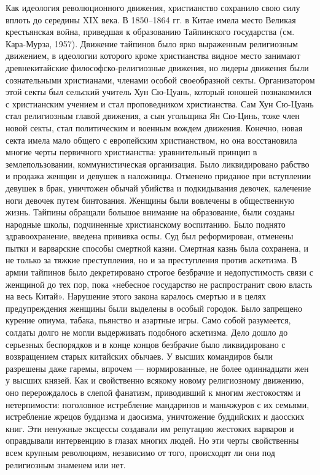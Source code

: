 Как   идеология   революционного  движения,   христианство   сохранило
свою  силу   вплоть  до  середины   XIX  века.  В  1850--1864   гг.  в
Китае   имела   место   Великая  крестьянская   война,   приведшая   к
образованию Тайпинского  государства (см. Кара-Мурза,  1957). Движение
тайпинов  было  ярко  выраженным религиозным  движением,  в  идеологии
которого  кроме  христианства  видное место  занимают  древнекитайские
философско-религиозные движения, но лидеры движения были сознательными
христианами,  членами особой  своеобразной  секты. Организатором  этой
секты был сельский учитель Хун Сю-Цуань, который юношей познакомился с
христианским  учением  и  стал  проповедником  христианства.  Сам  Хун
Сю-Цуань стал религиозным главой движения, а сын угольщика Ян Сю-Цинь,
тоже член  новой секты, стал  политическим и военным  вождем движения.
Конечно, новая секта имела мало общего с европейским христианством, но
она восстановила  многие черты первичного  христианства: уравнительный
принцип   в  землепользовании,   коммунистическая  организация.   Было
ликвидировано рабство и продажа женщин и девушек в наложницы. Отменено
приданое  при вступлении  девушек  в брак,  уничтожен обычай  убийства
и  подкидывания  девочек,  калечение ноги  девочек  путем  бинтования.
Женщины были вовлечены в  общественную жизнь. Тайпины обращали большое
внимание  на образование,  были  созданы  народные школы,  подчиненные
христианскому  воспитанию.   Было  поднято   здравоохранение,  введена
прививка  оспы.  Суд был  реформирован,  отменены  пытки и  варварские
способы смертной казни. Смертная казнь  была сохранена, и не только за
тяжкие преступления,  но и за  преступления против аскетизма.  В армии
тайпинов было декретировано строгое безбрачие и недопустимость связи с
женщиной до тех пор, пока  «небесное государство не распространит свою
власть на  весь Китай».  Нарушение этого закона  каралось смертью  и в
целях  предупреждения женщины  были  выделены в  особый городок.  Было
запрещено курение опиума, табака, пьянство и азартные игры. Само собой
разумеется, солдаты  долго не  могли выдерживать  подобного аскетизма.
Дело дошло  до серьезных беспорядков  и в конце концов  безбрачие было
ликвидировано  с  возвращением  старых  китайских  обычаев.  У  высших
командиров  были разрешены  даже  гаремы,  впрочем ---  нормированные,
не  более  одиннадцати   жен  у  высших  князей.   Как  и  свойственно
всякому  новому  религиозному  движению, оно  перерождалось  в  слепой
фанатизм, приводивший к многим  жестокостям и нетерпимости: поголовное
истребление  мандаринов   и  маньчжуров  с  их   семьями,  истребление
жрецов буддизма  и даосизма,  уничтожение буддийских и  даосских книг.
Эти  ненужные  эксцессы  создавали   им  репутацию  жестоких  варваров
и  оправдывали  интервенцию  в  глазах  многих  людей.  Но  эти  черты
свойственны всем крупным революциям, независимо от того, происходят ли
они под религиозным знаменем или нет.

